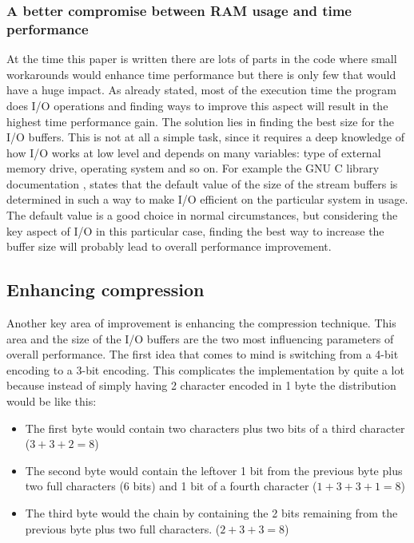 \documentclass[a4paper,12pt, oneside]{article}
\begin{document}
\subsubsection{A better compromise between RAM usage and time performance}

At the time this paper is written there are lots of parts in the code where small workarounds would enhance time performance but there is only few that would have a huge impact. As already stated, most of the execution time the program does I/O operations and finding ways to improve this aspect will result in the highest time performance gain. The solution lies in finding the best size for the I/O buffers. This is not at all a simple task, since it requires a deep knowledge of how I/O works at low level and depends on many variables: type of external memory drive, operating system and so on. For example the GNU C library documentation \cite{gnuc}, states that the default value of the size of the stream buffers is determined in such a way to make I/O efficient on the particular system in usage. The default value is a good choice in normal circumstances, but considering the key aspect of I/O in this particular case, finding the best way to increase the buffer size will probably lead to overall performance improvement.

\subsection{Enhancing compression}

Another key area of improvement is enhancing the compression technique. This area and the size of the I/O buffers are the two most influencing parameters of overall performance. The first idea that comes to mind is switching from a 4-bit encoding to a 3-bit encoding. This complicates the implementation by quite a lot because instead of simply having 2 character encoded in 1 byte the distribution would be like this:

\begin{itemize}
	\item The first byte would contain two characters plus two bits of a third character ($3 + 3 + 2 = 8$)
	\item The second byte would contain the leftover 1 bit from the previous byte plus two full characters (6 bits) and 1 bit of a fourth character ($1 + 3 + 3 + 1 = 8$)
	\item The third byte would  the chain by containing the 2 bits remaining from the previous byte plus two full characters. ($2 + 3 + 3 = 8$) 
\end{itemize}
\end{document}
